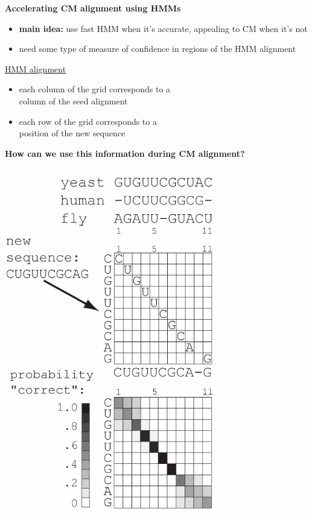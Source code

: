 \documentclass[landscape]{slides}
\begin{document}
\begin{slide}
\begin{center}

\textbf{Accelerating CM alignment using HMMs}
\end{center}
\medskip
\begin{minipage}{6in}
\footnotesize
\begin{itemize}
\item
\textbf{main idea:} use fast HMM when it's accurate, appealing to CM when it's not
\item
need some type of measure of confidence in regions of the HMM alignment

\end{itemize}
\small
\hspace{0.3in}
\underline{HMM alignment}%
\begin{itemize}
\item
each column of the grid corresponds to a \\ column
of the seed alignment
\item
each row of the grid corresponds to a \\ position of the new sequence
\end{itemize}
\begin{center}
\normalsize
\textbf{How can we use this information during CM alignment?}
\end{center}
\vspace{1.9in}
\end{minipage}
\begin{minipage}{4in}
\begin{center}
\includegraphics[height=6in]{figs/hmm_alignment2_layer3}

\end{center}
\end{minipage}
\end{slide}
\end{document}

